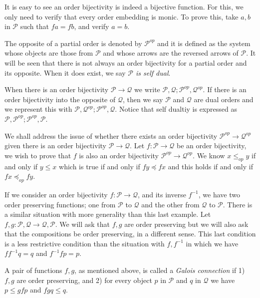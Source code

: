 \documentclass [12pt]{book}
\begin{document}
It is easy to see an order bijectivity is indeed a bijective function. For this, we only need to verify that every order embedding is monic. To prove this, take $a,b$ in $\mathcal P$ such that $fa=fb$, and verify $a=b$.


The opposite of a partial order is denoted by $\mathcal P^{op}$ and it is defined as the system whose objects are those from $\mathcal P$ and whose arrows are the reversed arrows of $\mathcal P$. It will be seen that there is not always an order bijectivity for a partial order and its opposite. When it does exist, we say \textit{$\mathcal P$ is self dual}.

When there is an order bijectivity $\mathcal P\rightarrow \mathcal Q$ we write $\mathcal P,\mathcal Q;\mathcal P^{op},\mathcal Q^{op}$. If there is an order bijectivity into the opposite of $\mathcal Q$, then we say $\mathcal P$ and $\mathcal Q$ are dual orders and we represent this with $\mathcal P,\mathcal Q^{op};\mathcal P^{op},\mathcal Q$. Notice that self dualtiy is expressed as $\mathcal P,\mathcal P^{op};\mathcal P^{op},\mathcal P$.

We shall address the issue of whether there exists an order bijectivity $\mathcal P^{op}\rightarrow\mathcal Q^{op}$ given there is an order bijectivity $\mathcal P\rightarrow\mathcal Q$. Let $f:\mathcal P\rightarrow\mathcal Q$ be an order bijectivity, we wish to prove that $f$ is also an order bijectivity $\mathcal P^{op}\rightarrow\mathcal Q^{op}$. We know $x\leq_{op}y$ if and only if $y\leq x$ which is true if and only if $fy\preceq fx$ and this holds if and only if $fx\preceq_{op}fy$.

If we consider an order bijectivity $f:\mathcal P\rightarrow\mathcal Q$, and its inverse $f^{-1}$, we have two order preserving functions; one from $\mathcal P$ to $\mathcal Q$ and the other from $\mathcal Q$ to $\mathcal P$. There is a similar situation with more generality than this last example. Let $f,g:\mathcal P,\mathcal Q\rightarrow\mathcal Q,\mathcal P$. We will ask that $f,g$ are order preserving but we will also ask that the compositions be order preserving, in a different sense. This last condition is a less restrictive condition than the situation with $f,f^{-1}$ in which we have $ff^{-1}q=q$ and $f^{-1}fp=p$.

\begin{definition}A pair of functions $f,g$, as mentioned above, is called a \textit{Galois connection} if 1) $f,g$ are order preserving, and 2) for every object $p$ in $\mathcal P$ and $q$ in $\mathcal Q$ we have $p\leq gfp$ and $fgq\leq q$. \end{definition}
\end{document}
